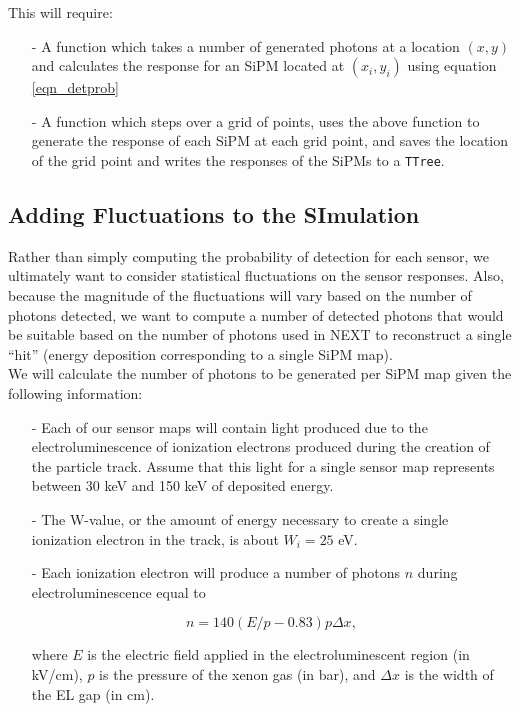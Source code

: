 \documentclass[10pt]{article}
\begin{document}
\noindent This will require:

\begin{enumerate}
	\item[-] A function which takes a number of generated photons at a location $(x,y)$ and calculates the response for an SiPM located at $(x_i,y_i)$ using equation \ref{eqn_detprob}
	\item[-] A function which steps over a grid of points, uses the above function to generate the response of each SiPM at each grid point, and saves the location of the grid point and 
	writes the responses of the SiPMs to a \verb|TTree|.
\end{enumerate}

\subsection{Adding Fluctuations to the SImulation}
\noindent Rather than simply computing the probability of detection for each sensor, we ultimately want to consider statistical fluctuations on the sensor responses.  Also, because the magnitude 
of the fluctuations will vary based on the number of photons detected, we want to compute a number of detected photons that would be suitable based on the number of photons used in NEXT
to reconstruct a single ``hit'' (energy deposition corresponding to a single SiPM map).\\

\noindent We will calculate the number of photons to be generated per SiPM map given the following information:

\begin{enumerate}
	\item[-] Each of our sensor maps will contain light produced due to the electroluminescence of ionization electrons produced during the creation of the particle track.  Assume that this light
	for a single sensor map represents between 30 keV and 150 keV of deposited energy.
	\item[-] The W-value, or the amount of energy necessary to create a single ionization electron in the track, is about $W_{i} = 25$ eV.
	\item[-] Each ionization electron will produce a number of photons $n$ during electroluminescence equal to
	
	\begin{equation}\label{eqn_ELgain}
	n = 140(E/p - 0.83)p\Delta x,
	\end{equation}
	
	\noindent where $E$ is the electric field applied in the electroluminescent region (in kV/cm), $p$ is the pressure of the xenon gas (in bar), and $\Delta x$ is the width of the EL gap (in cm).
\end{enumerate}
\end{document}
